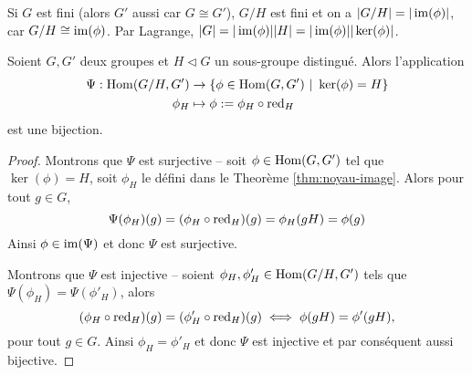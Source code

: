 \begin{corollary}
	Si $G$ est fini (alors $G'$ aussi car $G \cong G'$), $G/H$ est fini et on a
	$|G/H| = |\operatorname{im}(\phi)|$, car $G/H \cong \operatorname{im}(\phi)$.
	Par Lagrange, $|G| = |\operatorname{im}(\phi)||H| = |\operatorname{im}(\phi)||\ker(\phi)|$.
\end{corollary}

\begin{theorem}
	\label{thm:prop-quotient}
	Soient $G, G'$ deux groupes et $H \triangleleft G$ un sous-groupe distingué.
	Alors l'application
	\begin{align*}
		\Psi : \Hom(G/H, G') &\to \{\phi \in \Hom(G, G')\ |\ \ker(\phi) = H\}\\
		\phi_H &\mapsto \phi := \phi_H \circ \red_H
	\end{align*}
	est une bijection.
\end{theorem}

\begin{proof}
	Montrons que $\Psi$ est surjective -- soit $\phi \in \operatorname{Hom}(G, G')$
	tel que $\ker(\phi) = H$, soit $\phi_H$ le défini dans le
	Theorème \ref{thm:noyau-image}. Alors pour tout $g \in G$,
	\begin{equation*}
		\Psi(\phi_H)(g) = (\phi_H \circ \operatorname{red}_H) (g) = \phi_H(gH) = \phi(g)
	\end{equation*}
	Ainsi $\phi \in \operatorname{im}(\Psi)$ et donc $\Psi$ est surjective.  

	Montrons que $\Psi$ est injective -- soient $\phi_H, \phi'_H \in \operatorname{Hom}(G/H, G')$
	tels que $\Psi(\phi_H) = \Psi(\phi'_H)$, alors
	\begin{equation*}
		(\phi_H \circ \operatorname{red}_H)(g) = (\phi'_H \circ \operatorname{red}_H)(g)	
		\iff \phi(gH) = \phi'(gH),
	\end{equation*}
	pour tout $g \in G$. Ainsi $\phi_H = \phi'_H$ et donc $\Psi$ est injective
	et par conséquent aussi bijective.
\end{proof}


